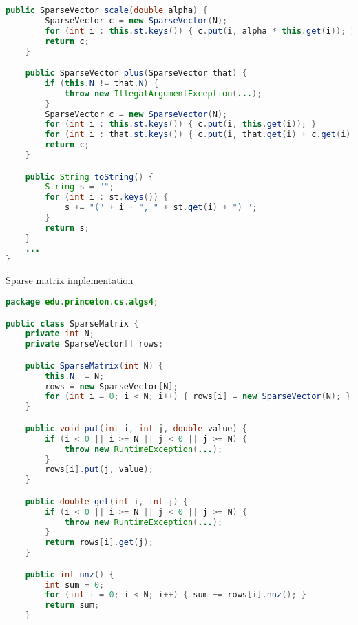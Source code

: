 \documentclass[8pt,a4paper,compress]{beamer}
\begin{document}
\begin{frame}[fragile]
\begin{lstlisting}[language=Java]
    public SparseVector scale(double alpha) {
        SparseVector c = new SparseVector(N);
        for (int i : this.st.keys()) { c.put(i, alpha * this.get(i)); }
        return c;
    }

    public SparseVector plus(SparseVector that) {
        if (this.N != that.N) {
            throw new IllegalArgumentException(...); 
        }
        SparseVector c = new SparseVector(N);
        for (int i : this.st.keys()) { c.put(i, this.get(i)); }
        for (int i : that.st.keys()) { c.put(i, that.get(i) + c.get(i)); } 
        return c;
    }

    public String toString() {
        String s = "";
        for (int i : st.keys()) {
            s += "(" + i + ", " + st.get(i) + ") ";
        }
        return s;
    }
    ...
}
\end{lstlisting}
\end{frame}

\begin{frame}[fragile]
Sparse matrix implementation
\begin{lstlisting}[language=Java]
package edu.princeton.cs.algs4;

public class SparseMatrix {
    private int N; 
    private SparseVector[] rows; 

    public SparseMatrix(int N) {
        this.N  = N;
        rows = new SparseVector[N];
        for (int i = 0; i < N; i++) { rows[i] = new SparseVector(N); }
    }

    public void put(int i, int j, double value) {
        if (i < 0 || i >= N || j < 0 || j >= N) { 
            throw new RuntimeException(...); 
        }
        rows[i].put(j, value);
    }

    public double get(int i, int j) {
        if (i < 0 || i >= N || j < 0 || j >= N) { 
            throw new RuntimeException(...); 
        }
        return rows[i].get(j);
    }

    public int nnz() { 
        int sum = 0;
        for (int i = 0; i < N; i++) { sum += rows[i].nnz(); }
        return sum;
    }
\end{lstlisting}
\end{frame}
\end{document}
